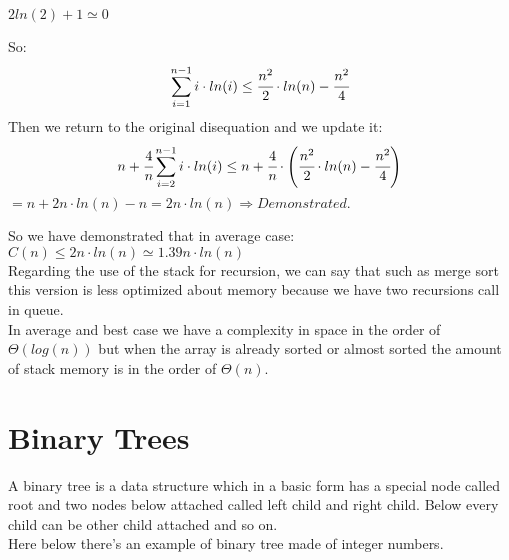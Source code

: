 \documentclass{article}
\begin{document}
\begin{large}
$2ln(2) + 1 \simeq 0$

So:\\
$$\sum_{i=1}^{n-1} i \cdot ln(i) \leq \cfrac{n^2}{2}\cdot ln(n) - \cfrac{n^2}{4}$$
Then we return to the original disequation and we update it:\\
$$ n + \cfrac{4}{n} \sum_{i=2}^{n-1} i \cdot ln(i) \leq n + \cfrac{4}{n} \cdot \left(\cfrac{n^2}{2}\cdot ln(n) - \cfrac{n^2}{4} \right)$$
$= n + 2n\cdot ln(n) -n = 2n\cdot ln(n) \Rightarrow Demonstrated.$

So we have demonstrated that in average case: \\ 
$C(n) \leq 2n\cdot ln(n) \simeq 1.39n\cdot ln(n)$\\

Regarding the use of the stack for recursion, we can say that such as merge sort this version is less optimized about memory because we have two recursions call in queue.\\
In average and best case we have a complexity in space in the order of $\Theta(log(n))$ but when the array is already sorted or almost sorted the amount of stack memory is in the order of $\Theta(n)$.
\end{large}
\section{Binary Trees}
A binary tree is a data structure which in a basic form has a special node called root and two nodes below attached called left child and right child. Below every child can be other child attached and so on. \\
Here below there's an example of binary tree made of integer numbers.

\end{document}
